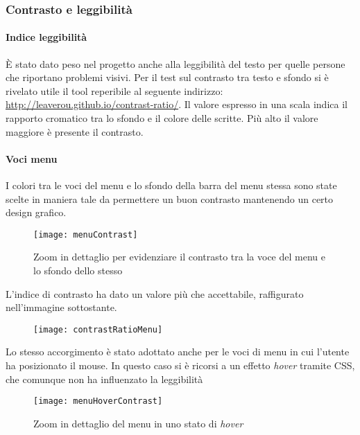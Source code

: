 \newpage

\subsubsection{Contrasto e leggibilit\`a}

\paragraph*{Indice leggibilità}\`E stato dato peso nel progetto anche alla leggibilit\`a del testo per quelle persone che riportano problemi visivi. Per il test sul contrasto tra testo e sfondo si \`e rivelato utile il tool reperibile al seguente indirizzo: \url{http://leaverou.github.io/contrast-ratio/}.
Il valore espresso in una scala indica il rapporto cromatico tra lo sfondo e il colore delle scritte. Più alto il valore maggiore è presente il contrasto.

\paragraph*{Voci menu}I colori tra le voci del menu e lo sfondo della barra del menu stessa sono state scelte in maniera tale da permettere un buon contrasto mantenendo un certo design grafico.
\begin{figure}[H]

    \centering
    \texttt{[image: menuContrast]}
    \caption{Zoom in dettaglio per evidenziare il contrasto tra la voce del menu e lo sfondo dello stesso}

\end{figure}

L'indice di contrasto ha dato un valore più che accettabile, raffigurato nell'immagine sottostante.
\begin{figure}[H]

    \centering
    \texttt{[image: contrastRatioMenu]}

\end{figure}


Lo stesso accorgimento è stato adottato anche per le voci di menu in cui l'utente ha posizionato il mouse. In questo caso si è ricorsi a un effetto \textit{hover} tramite CSS, che comunque non ha influenzato la leggibilità
\begin{figure}[H]

    \centering
    \texttt{[image: menuHoverContrast]}
    \caption{Zoom in dettaglio del menu in uno stato di \textit{hover}}

\end{figure}

